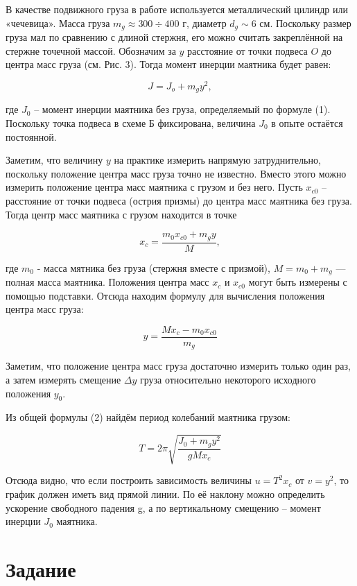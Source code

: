 \documentclass[12pt, a4paper]{article}
\begin{document}
В качестве подвижного груза в работе используется металлический цилиндр или
«чечевица». Масса груза $m_g \approx 300 \div 400$ г, диаметр $d_g \sim 6$ см.
Поскольку размер груза мал по сравнению с длиной стержня, его можно
считать закреплённой на стержне точечной массой. Обозначим за $y$ расстояние
от точки подвеса $O$ до центра масс груза (см. Рис. 3). Тогда момент инерции
маятника будет равен:

\[J = J_o + m_gy^2,\]

где $J_0$ -- момент инерции маятника без груза, определяемый по формуле (1).
Поскольку точка подвеса в схеме Б фиксирована, величина $J_0$ в опыте остаётся
постоянной.

Заметим, что величину $y$ на практике измерить напрямую затруднительно,
поскольку положение центра масс груза точно не известно. Вместо этого можно
измерить положение центра масс маятника с грузом и без него.
Пусть $x_{c0}$ -- расстояние от точки подвеса (острия
призмы) до центра масс маятника без груза. Тогда центр
масс маятника с грузом находится в точке

\[x_c = \frac{m_0x_{c0} + m_gy}{M},\]

где $m_0$ - масса мятника без груза (стержня вместе с призмой),
$M = m_0 + m_g$ — полная масса маятника. Положения центра масс
$x_c$ и $x_{c0}$ могут быть измерены с помощью подставки. Отсюда находим
формулу для вычисления положения центра масс груза:

\begin{equation}
    y = \frac{Mx_c - m_0x_{c0}}{m_g}
\end{equation}

Заметим, что положение центра масс груза достаточно измерить
\newline
только один раз, а затем измерять смещение $\Delta{y}$ груза относительно
некоторого исходного положения $y_0$.

Из общей формулы (2) найдём период колебаний маятника грузом:

\begin{equation}
    T = 2\pi\sqrt{\frac{J_0 + m_gy^2}{gMx_c}}
\end{equation}

Отсюда видно, что если построить зависимость величины $u = T^2x_c$ от
$v = y^2$, то график должен иметь вид прямой линии. По её наклону можно
определить ускорение свободного падения g, а по вертикальному смещению --
момент инерции $J_0$ маятника.

\section{Задание}
\end{document}

